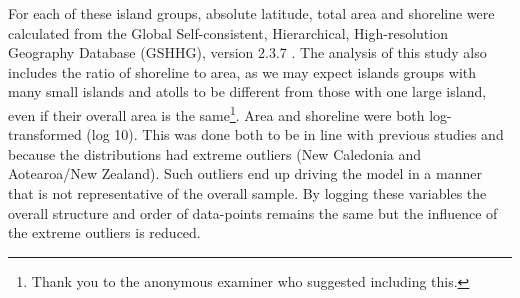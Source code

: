 \documentclass[a4paper,10pt]{article} %
\begin{document}
For each of these island groups, absolute latitude, total area and shoreline were calculated from the Global Self-consistent, Hierarchical, High-resolution Geography Database (GSHHG), version 2.3.7 \citep{wessel1996global}. The analysis of this study also includes the ratio of shoreline to area, as we may expect islands groups with many small islands and atolls to be different from those with one large island, even if their overall area is the same\footnote{Thank you to the anonymous examiner who suggested including this.}. Area and shoreline were both log-transformed (log 10). This was done both to be in line with previous studies \citep{gavin2012island} and because the distributions had extreme outliers (New Caledonia and Aotearoa/New Zealand). Such outliers end up driving the model in a manner that is not representative of the overall sample. By logging these variables the overall structure and order of data-points remains the same but the influence of the extreme outliers is reduced.


\end{document}
